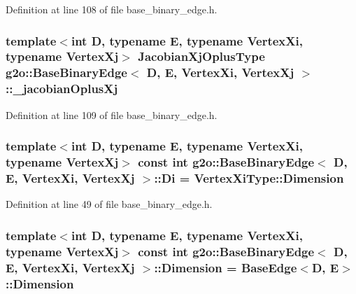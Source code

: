 Definition at line 108 of file base\+\_\+binary\+\_\+edge.\+h.

\subsubsection[{\texorpdfstring{\+\_\+jacobian\+Oplus\+Xj}{_jacobianOplusXj}}]{\setlength{\rightskip}{0pt plus 5cm}template$<$int D, typename E, typename Vertex\+Xi, typename Vertex\+Xj$>$ {\bf Jacobian\+Xj\+Oplus\+Type} {\bf g2o\+::\+Base\+Binary\+Edge}$<$ D, E, Vertex\+Xi, Vertex\+Xj $>$\+::\+\_\+jacobian\+Oplus\+Xj\hspace{0.3cm}{\ttfamily [protected]}}\hypertarget{classg2o_1_1BaseBinaryEdge_ad448518247044496cb99c9d70bd1a363}{}\label{classg2o_1_1BaseBinaryEdge_ad448518247044496cb99c9d70bd1a363}


Definition at line 109 of file base\+\_\+binary\+\_\+edge.\+h.

\subsubsection[{\texorpdfstring{Di}{Di}}]{\setlength{\rightskip}{0pt plus 5cm}template$<$int D, typename E, typename Vertex\+Xi, typename Vertex\+Xj$>$ const int {\bf g2o\+::\+Base\+Binary\+Edge}$<$ D, E, Vertex\+Xi, Vertex\+Xj $>$\+::Di = Vertex\+Xi\+Type\+::\+Dimension\hspace{0.3cm}{\ttfamily [static]}}\hypertarget{classg2o_1_1BaseBinaryEdge_abfe232196405a7204bc299a747c1cc8b}{}\label{classg2o_1_1BaseBinaryEdge_abfe232196405a7204bc299a747c1cc8b}


Definition at line 49 of file base\+\_\+binary\+\_\+edge.\+h.

\subsubsection[{\texorpdfstring{Dimension}{Dimension}}]{\setlength{\rightskip}{0pt plus 5cm}template$<$int D, typename E, typename Vertex\+Xi, typename Vertex\+Xj$>$ const int {\bf g2o\+::\+Base\+Binary\+Edge}$<$ D, E, Vertex\+Xi, Vertex\+Xj $>$\+::Dimension = {\bf Base\+Edge}$<$D, E$>$\+::Dimension\hspace{0.3cm}{\ttfamily [static]}}\hypertarget{classg2o_1_1BaseBinaryEdge_af3c134948e48c446762fa4e427d1cca5}{}\label{classg2o_1_1BaseBinaryEdge_af3c134948e48c446762fa4e427d1cca5}


